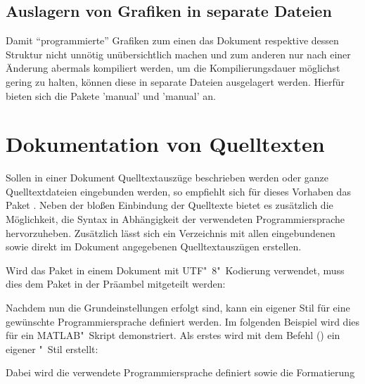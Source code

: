\documentclass[%
  english,ngerman,%
  cdgeometry=no,DIV=12,automark%
]{tudscrartcl}
\begin{document}
\subsection{Auslagern von Grafiken in separate Dateien}
Damit \enquote{programmierte} Grafiken zum einen das Dokument respektive dessen 
Struktur nicht unnötig unübersichtlich machen und zum anderen nur nach einer 
Änderung abermals kompiliert werden, um die Kompilierungsdauer möglichst gering 
zu halten, können diese in separate Dateien ausgelagert werden. Hierfür bieten 
sich die Pakete 'manual' und 'manual' an.



\section{Dokumentation von Quelltexten}
Sollen in einer Dokument Quelltextauszüge beschrieben werden oder ganze 
Quelltextdateien eingebunden werden, so empfiehlt sich für dieses Vorhaben das 
Paket . Neben der bloßen Einbindung der Quelltexte bietet es 
zusätzlich die Möglichkeit, die Syntax in Abhängigkeit der verwendeten 
Programmiersprache hervorzuheben. Zusätzlich lässt sich ein Verzeichnis mit 
allen eingebundenen sowie direkt im Dokument angegebenen Quelltextauszügen 
erstellen.
%
\begin{Hint}
\usepackage{listings}
\end{Hint}
%
Wird das Paket in einem Dokument mit UTF"~8"~Kodierung verwendet, muss dies dem 
Paket in der Präambel mitgeteilt werden:
%
\begin{Hint}
\end{Hint}
%
Nachdem nun die Grundeinstellungen erfolgt sind, kann ein eigener Stil für eine 
gewünschte Programmiersprache definiert werden. Im folgenden Beispiel wird dies 
für ein MATLAB"~Skript demonstriert. Als erstes wird mit dem Befehl 
() ein eigener "~Stil 
erstellt:
%
\begin{Hint*}
\end{Hint*}
%
Dabei wird die verwendete Programmiersprache definiert sowie die Formatierung 
\end{document}
